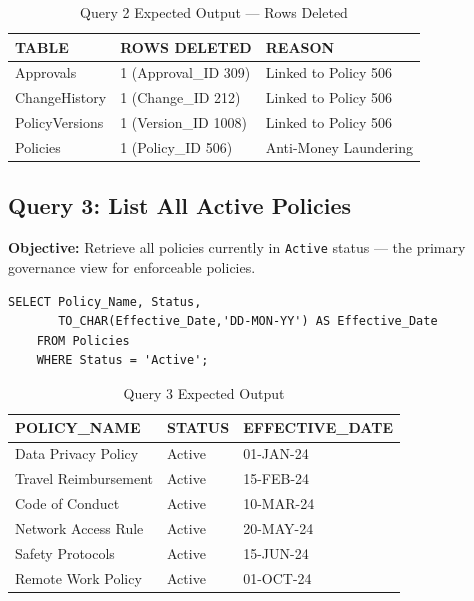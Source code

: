 \documentclass[conference]{IEEEtran}
\begin{document}
\begin{table}[H]
\centering
\caption{Query 2 Expected Output — Rows Deleted}
\begin{tabular}{|l|l|l|}
\hline
\textbf{TABLE} & \textbf{ROWS DELETED} & \textbf{REASON} \\
\hline
Approvals       & 1 (Approval\_ID 309)   & Linked to Policy 506 \\
ChangeHistory   & 1 (Change\_ID 212)     & Linked to Policy 506 \\
PolicyVersions  & 1 (Version\_ID 1008)   & Linked to Policy 506 \\
Policies        & 1 (Policy\_ID 506)     & Anti-Money Laundering \\
\hline
\end{tabular}
\end{table}

\subsection{Query 3: List All Active Policies}

\textbf{Objective:} Retrieve all policies currently in \texttt{Active} status — the primary governance view for enforceable policies.

\begin{lstlisting}[style=sqlstyle, caption={Query 3: Active Policies}]
SELECT Policy_Name, Status,
       TO_CHAR(Effective_Date,'DD-MON-YY') AS Effective_Date
    FROM Policies
    WHERE Status = 'Active';
\end{lstlisting}

\begin{table}[H]
\centering
\caption{Query 3 Expected Output}
\begin{tabular}{|l|l|l|}
\hline
\textbf{POLICY\_NAME} & \textbf{STATUS} & \textbf{EFFECTIVE\_DATE} \\
\hline
Data Privacy Policy  & Active & 01-JAN-24 \\
Travel Reimbursement & Active & 15-FEB-24 \\
Code of Conduct      & Active & 10-MAR-24 \\
Network Access Rule  & Active & 20-MAY-24 \\
Safety Protocols     & Active & 15-JUN-24 \\
Remote Work Policy   & Active & 01-OCT-24 \\
\hline
\end{tabular}
\end{table}
\end{document}
